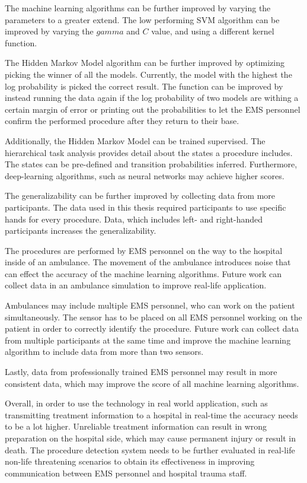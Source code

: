\par The machine learning algorithms can be further improved by varying the parameters to a greater extend. The low performing SVM algorithm can be improved by varying the $gamma$ and $C$ value, and using a different kernel function.
\par The Hidden Markov Model algorithm can be further improved by optimizing picking the winner of all the models. Currently, the model with the highest the log probability is picked the correct result. The function can be improved by instead running the data again if the log probability of two models are withing a certain margin of error or printing out the probabilities to let the EMS personnel confirm the performed procedure after they return to their base.
\par Additionally, the Hidden Markov Model can be trained supervised. The hierarchical task analysis provides detail about the states a procedure includes. The states can be pre-defined and transition probabilities inferred. Furthermore, deep-learning algorithms, such as neural networks may achieve higher scores.
\par The generalizability can be further improved by collecting data from more participants. The data used in this thesis required participants to use specific hands for every procedure. Data, which includes left- and right-handed participants increases the generalizability.
\par The procedures are performed by EMS personnel on the way to the hospital inside of an ambulance. The movement of the ambulance introduces noise that can effect the accuracy of the machine learning algorithms. Future work can collect data in an ambulance simulation to improve real-life application.
\par Ambulances may include multiple EMS personnel, who can work on the patient simultaneously. The sensor has to be placed on all EMS personnel working on the patient in order to correctly identify the procedure. Future work can collect data from multiple participants at the same time and improve the machine learning algorithm to include data from more than two sensors.
\par Lastly, data from professionally trained EMS personnel may result in more consistent data, which may improve the score of all machine learning algorithms.
\par Overall, in order to use the technology in real world application, such as transmitting treatment information to a hospital in real-time the accuracy needs to be a lot higher. Unreliable treatment information can result in wrong preparation on the hospital side, which may cause permanent injury or result in death. The procedure detection system needs to be further evaluated in real-life non-life threatening scenarios to obtain its effectiveness in improving communication between EMS personnel and hospital trauma staff.